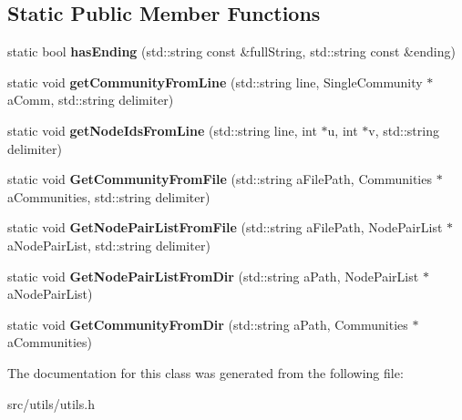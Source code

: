 \subsection*{Static Public Member Functions}
\begin{DoxyCompactItemize}
\item 
\hypertarget{classall__distance__sketch_1_1utils_1_1FileUtils_a57e1b9eaacf3f228097701a7bb36e65a}{}static bool {\bfseries has\+Ending} (std\+::string const \&full\+String, std\+::string const \&ending)\label{classall__distance__sketch_1_1utils_1_1FileUtils_a57e1b9eaacf3f228097701a7bb36e65a}

\item 
\hypertarget{classall__distance__sketch_1_1utils_1_1FileUtils_af5062348f8dbfdfd27b60f2e196c9e8c}{}static void {\bfseries get\+Community\+From\+Line} (std\+::string line, Single\+Community $\ast$a\+Comm, std\+::string delimiter)\label{classall__distance__sketch_1_1utils_1_1FileUtils_af5062348f8dbfdfd27b60f2e196c9e8c}

\item 
\hypertarget{classall__distance__sketch_1_1utils_1_1FileUtils_adb412168b7200c529ea8fb23431461e5}{}static void {\bfseries get\+Node\+Ids\+From\+Line} (std\+::string line, int $\ast$u, int $\ast$v, std\+::string delimiter)\label{classall__distance__sketch_1_1utils_1_1FileUtils_adb412168b7200c529ea8fb23431461e5}

\item 
\hypertarget{classall__distance__sketch_1_1utils_1_1FileUtils_a123c9c39616968a450ccb5381b574f63}{}static void {\bfseries Get\+Community\+From\+File} (std\+::string a\+File\+Path, Communities $\ast$a\+Communities, std\+::string delimiter)\label{classall__distance__sketch_1_1utils_1_1FileUtils_a123c9c39616968a450ccb5381b574f63}

\item 
\hypertarget{classall__distance__sketch_1_1utils_1_1FileUtils_afc94f87777d81d77bb1e3a65a007302b}{}static void {\bfseries Get\+Node\+Pair\+List\+From\+File} (std\+::string a\+File\+Path, Node\+Pair\+List $\ast$a\+Node\+Pair\+List, std\+::string delimiter)\label{classall__distance__sketch_1_1utils_1_1FileUtils_afc94f87777d81d77bb1e3a65a007302b}

\item 
\hypertarget{classall__distance__sketch_1_1utils_1_1FileUtils_a28881648edc0a8e13bbb8027d8898be3}{}static void {\bfseries Get\+Node\+Pair\+List\+From\+Dir} (std\+::string a\+Path, Node\+Pair\+List $\ast$a\+Node\+Pair\+List)\label{classall__distance__sketch_1_1utils_1_1FileUtils_a28881648edc0a8e13bbb8027d8898be3}

\item 
\hypertarget{classall__distance__sketch_1_1utils_1_1FileUtils_acb47475250d450413ee37e20e7b1447e}{}static void {\bfseries Get\+Community\+From\+Dir} (std\+::string a\+Path, Communities $\ast$a\+Communities)\label{classall__distance__sketch_1_1utils_1_1FileUtils_acb47475250d450413ee37e20e7b1447e}

\end{DoxyCompactItemize}


The documentation for this class was generated from the following file\+:\begin{DoxyCompactItemize}
\item 
src/utils/utils.\+h\end{DoxyCompactItemize}
